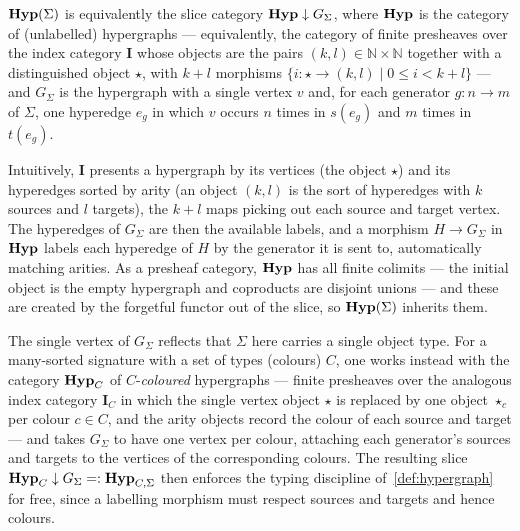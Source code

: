 \begin{proposition}
$\mathbf{Hyp}(\Sigma)$ is equivalently the slice category $\mathbf{Hyp} \downarrow G_{\Sigma}$, where $\mathbf{Hyp}$ is the category of (unlabelled) hypergraphs --- equivalently, the category of finite presheaves over the index category $\mathbf{I}$ whose objects are the pairs $(k, l) \in \mathbb{N} \times \mathbb{N}$ together with a distinguished object $\star$, with $k + l$ morphisms $\{ i\colon \star \to (k, l) \mid 0 \leq i < k + l \}$ --- and $G_{\Sigma}$ is the hypergraph with a single vertex $v$ and, for each generator $g : n \to m$ of $\Sigma$, one hyperedge $e_g$ in which $v$ occurs $n$ times in $s(e_g)$ and $m$ times in $t(e_g)$.
\end{proposition}
Intuitively, $\mathbf{I}$ presents a hypergraph by its vertices (the object $\star$) and its hyperedges sorted by arity (an object $(k,l)$ is the sort of hyperedges with $k$ sources and $l$ targets), the $k+l$ maps picking out each source and target vertex.
The hyperedges of $G_{\Sigma}$ are then the available labels, and a morphism $H \to G_{\Sigma}$ in $\mathbf{Hyp}$ labels each hyperedge of $H$ by the generator it is sent to, automatically matching arities.
As a presheaf category, $\mathbf{Hyp}$ has all finite colimits --- the initial object is the empty hypergraph and coproducts are disjoint unions --- and these are created by the forgetful functor out of the slice, so $\mathbf{Hyp}(\Sigma)$ inherits them.

The single vertex of $G_{\Sigma}$ reflects that $\Sigma$ here carries a single object type.
For a many-sorted signature with a set of types (colours) $C$, one works instead with the category $\mathbf{Hyp}_{C}$ of $C$-\emph{coloured} hypergraphs --- finite presheaves over the analogous index category $\mathbf{I}_{C}$ in which the single vertex object $\star$ is replaced by one object $\star_{c}$ per colour $c \in C$, and the arity objects record the colour of each source and target --- and takes $G_{\Sigma}$ to have one vertex per colour, attaching each generator's sources and targets to the vertices of the corresponding colours.
The resulting slice $\mathbf{Hyp}_{C} \downarrow G_{\Sigma} =: \mathbf{Hyp}_{C,\Sigma}$ then enforces the typing discipline of~\autoref{def:hypergraph} for free, since a labelling morphism must respect sources and targets and hence colours.


